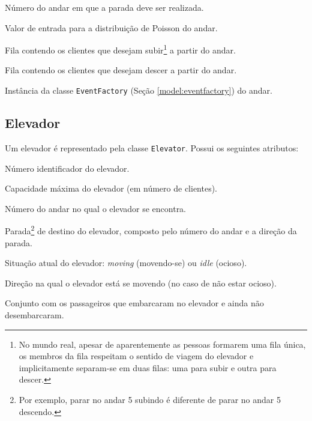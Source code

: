  \begin{description}[leftmargin=!,labelwidth=\widthof{\bfseries eventFactory}]\setlength\itemsep{0mm}
    \item[\texttt{number}] Número do andar em que a parada deve ser realizada.
    \item[\texttt{lambda}] Valor de entrada para a distribuição de Poisson do andar.
    \item[\texttt{upLine}] Fila contendo os clientes que desejam subir\footnote{No mundo real, apesar de aparentemente as pessoas formarem
    uma fila única, os membros da fila respeitam o sentido de viagem do elevador
    e implicitamente separam-se em duas filas: uma para subir e outra para
    descer.} a partir do andar.
    \item[\texttt{downLine}] Fila contendo os clientes que desejam descer a partir do andar.
    \item[\texttt{eventFactory}] Instância da classe \texttt{EventFactory} (Seção \ref{model:eventfactory}) do andar.
  \end{description}

\subsection{Elevador}

  Um elevador é representado pela classe \texttt{Elevator}. Possui os seguintes
  atributos:

  \begin{description}[leftmargin=!,labelwidth=\widthof{\bfseries arrivalFloor}]\setlength\itemsep{0mm}
    \item[\texttt{number}] Número identificador do elevador.
    \item[\texttt{capacity}] Capacidade máxima do elevador (em número de clientes).
    \item[\texttt{location}] Número do andar no qual o elevador se encontra.
    \item[\texttt{destination}] Parada\footnote{Por exemplo, parar no andar 5 subindo é diferente de parar no andar 5 descendo.} de destino do elevador, composto pelo número do andar e a direção da parada.
    \item[\texttt{status}] Situação atual do elevador: \textit{moving} (movendo-se) ou \textit{idle} (ocioso).
    \item[\texttt{direction}] Direção na qual o elevador está se movendo (no caso de não estar ocioso).
    \item[\texttt{passengers}] Conjunto com os passageiros que embarcaram no elevador e ainda não desembarcaram.
  \end{description}

